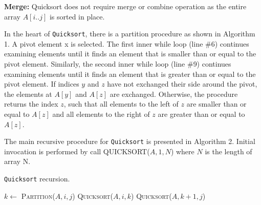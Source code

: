 \documentclass[a4paper, 10pt,twocolumn]{article}
\begin{document}
\vspace{1.5mm}
\noindent \textbf{Merge: }Quicksort does not require merge or combine operation as the entire array $A[i..j]$ is sorted in place. \par
In the heart of \texttt{Quicksort}, there is a partition procedure as shown in Algorithm 1. A pivot element x is selected. The first inner while loop (line $\#$6) continues examining elements until it finds an element that is smaller than or equal to the pivot element. Similarly, the second inner while loop (line $\#$9) continues examining elements until it finds an element that is greater than or equal to the pivot element. If indices $y$ and $z$ have not exchanged their side around the pivot, the elements at $A[y]$ and $A[z]$ are exchanged. Otherwise, the procedure returns the index $z$, such that all elements to the left of $z$ are smaller than or equal to $A[z]$ and all elements to the right of $z$ are greater than or equal to $A[z]$. \par
The main recursive procedure for \texttt{Quicksort} is presented in Algorithm 2. Initial invocation is performed by call QUICKSORT($A, 1, N$) where $N$ is the length of array N. 
\begin{algorithm}[t]
  \caption{\texttt{Quicksort} recursion.}
  \label{algo:ins_sort1}
  \begin{algorithmic}[1]
     \newline
	 	\State $k \leftarrow$ \textsc{Partition}($A,i,j$)
    	\State \textsc{Quicksort}($A,i,k$)
   		\State \textsc{Quicksort}($A,k+1,j$)      
	 \EndIf
     \EndProcedure 
   \end{algorithmic}
\end{algorithm}
\end{document}
